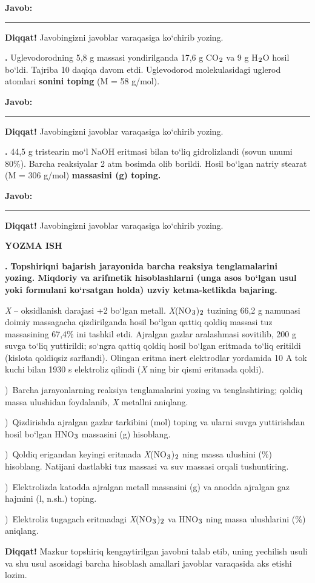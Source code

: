 \documentclass[11pt,a4paper]{article}
\renewcommand{\textsubscript}[1]{\ensuremath{_{\text{\fontsize{8}{8}\selectfont #1}}}}
\newcommand{\qn}[1]{\textbf{\fontsize{11.5}{13}\selectfont #1}}
\newcommand{\qsep}{\par\vspace{13pt}}
\newcommand{\diqqat}[1]{\par\smallskip\noindent\textbf{Diqqat!} #1\par\medskip}
\newcommand{\javob}{\par\nopagebreak[4]\smallskip\noindent\textbf{Javob:} \rule[-2pt]{7.5cm}{0.4pt}\par\smallskip\noindent\textbf{Diqqat!} Javobingizni javoblar varaqasiga ko`chirib yozing.\par\medskip}
\begin{document}
\javob\qsep
\noindent\qn{39.} Uglevodorodning 5,8 g massasi yondirilganda 17,6 g CO\textsubscript{2} va 9 g H\textsubscript{2}O hosil bo`ldi. Tajriba 10 daqiqa davom etdi. Uglevodorod molekulasidagi uglerod atomlari \textbf{sonini toping} (M = 58 g/mol).
\javob\qsep
\noindent\qn{40.} 44,5 g tristearin mo`l NaOH eritmasi bilan to`liq gidrolizlandi (sovun unumi 80\%). Barcha reaksiyalar 2 atm bosimda olib borildi. Hosil bo`lgan natriy stearat (M = 306 g/mol) \textbf{massasini (g) toping.}
\javob\qsep
\par\bigskip\begin{center}\textbf{\fontsize{13}{15}\selectfont YOZMA ISH}\end{center}
\noindent\qn{41.} \textbf{Topshiriqni bajarish jarayonida barcha reaksiya tenglamalarini yozing. Miqdoriy va arifmetik hisoblashlarni (unga asos bo`lgan usul yoki formulani ko`rsatgan holda) uzviy ketma-ketlikda bajaring.}\par\smallskip
\textit{X} -- oksidlanish darajasi +2 bo`lgan metall. \textit{X}(NO\textsubscript{3})\textsubscript{2} tuzining 66,2 g namunasi doimiy massagacha qizdirilganda hosil bo`lgan qattiq qoldiq massasi tuz massasining 67,4\% ini tashkil etdi. Ajralgan gazlar aralashmasi sovitilib, 200 g suvga to`liq yuttirildi; so`ngra qattiq qoldiq hosil bo`lgan eritmada to`liq eritildi (kislota qoldiqsiz sarflandi). Olingan eritma inert elektrodlar yordamida 10 A tok kuchi bilan 1930 s elektroliz qilindi (\textit{X} ning bir qismi eritmada qoldi).\par
{})\ Barcha jarayonlarning reaksiya tenglamalarini yozing va tenglashtiring; qoldiq massa ulushidan foydalanib, \textit{X} metallni aniqlang.\par
{})\ Qizdirishda ajralgan gazlar tarkibini (mol) toping va ularni suvga yuttirishdan hosil bo`lgan HNO\textsubscript{3} massasini (g) hisoblang.\par
{})\ Qoldiq erigandan keyingi eritmada \textit{X}(NO\textsubscript{3})\textsubscript{2} ning massa ulushini (\%) hisoblang. Natijani dastlabki tuz massasi va suv massasi orqali tushuntiring.\par
{})\ Elektrolizda katodda ajralgan metall massasini (g) va anodda ajralgan gaz hajmini (l, n.sh.) toping.\par
{})\ Elektroliz tugagach eritmadagi \textit{X}(NO\textsubscript{3})\textsubscript{2} va HNO\textsubscript{3} ning massa ulushlarini (\%) aniqlang.\par
\diqqat{Mazkur topshiriq kengaytirilgan javobni talab etib, uning yechilish usuli va shu usul asosidagi barcha hisoblash amallari javoblar varaqasida aks etishi lozim.}\qsep
\end{document}
